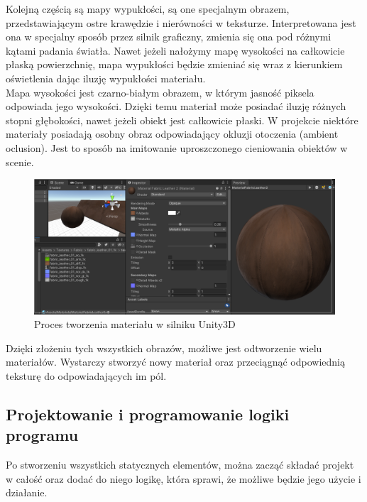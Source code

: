 \documentclass{article} %
\begin{document}
            Kolejną częścią są mapy wypukłości, są one specjalnym obrazem, przedstawiającym ostre krawędzie i nierówności w teksturze. Interpretowana jest ona w specjalny sposób przez silnik graficzny, zmienia się ona pod różnymi kątami padania światła. Nawet jeżeli nałożymy mapę wysokości na całkowicie płaską powierzchnię, mapa wypukłości będzie zmieniać się wraz z kierunkiem oświetlenia dając iluzję wypukłości materiału.
            \\
            
            Mapa wysokości jest czarno-białym obrazem, w którym jasność piksela odpowiada jego wysokości. Dzięki temu materiał może posiadać iluzję różnych stopni głębokości, nawet jeżeli obiekt jest całkowicie płaski. W projekcie niektóre materiały posiadają osobny obraz odpowiadający okluzji otoczenia (ambient oclusion). Jest to sposób na imitowanie uproszczonego cieniowania obiektów w scenie.
            \\
            
            \begin{figure}[h]
            \centering
            \includegraphics[bb=0 0 1164 524,scale=0.4,keepaspectratio=true]{images/screenshots/work/8-tworzenie-materialow_000.png}
            \caption{Proces tworzenia materiału w silniku Unity3D}
            \end{figure}
            
            Dzięki złożeniu tych wszystkich obrazów, możliwe jest odtworzenie wielu materiałów. Wystarczy stworzyć nowy materiał oraz przeciągnąć odpowiednią teksturę do odpowiadających im pól. 
            \\

            
    \subsection{Projektowanie i programowanie logiki programu}
        Po stworzeniu wszystkich statycznych elementów, można zacząć składać projekt w całość oraz dodać do niego logikę, która sprawi, że możliwe będzie jego użycie i działanie.
        \\
    
\end{document}
